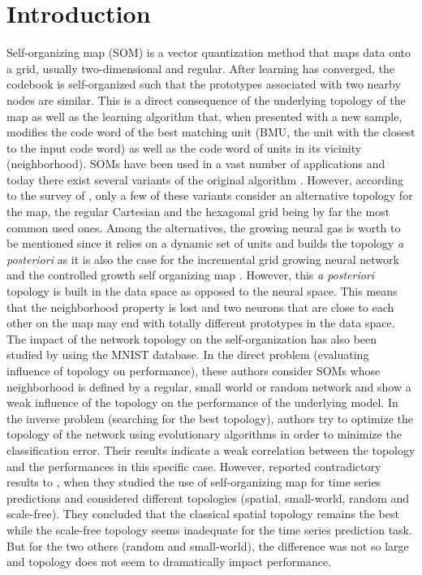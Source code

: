 \section{Introduction}

Self-organizing map \citep{Kohonen:1982} (SOM) is a vector quantization method that maps data onto a grid, usually two-dimensional and regular. After learning has converged, the codebook is self-organized such that the prototypes associated with two nearby nodes are similar. This is a direct consequence of the underlying topology of the map as well as the learning algorithm that, when presented with a new sample, modifies the code word of the best matching unit (BMU, the unit with the closest to the input code word) as well as the code word of units in its vicinity (neighborhood). SOMs have been used in a vast number of applications \citep{Kaski:1998,Oja:2003,Polla:2009} and today there exist several variants of the original algorithm \citep{Kohonen:2001}. However, according to the survey of \citet{Astudillo:2014}, only a few of these variants consider an alternative topology for the map, the regular Cartesian and the hexagonal grid being by far the most common used ones. Among the alternatives, the growing neural gas \citep{Fritzke:1994} is worth to be mentioned since it relies on a dynamic set of units and builds the topology {\em a posteriori} as it is also the case for the incremental grid growing neural network \citep{Blackmore:1995} and the controlled growth self organizing map \citep{Alahakoon:2000}. However, this {\em a posteriori} topology is built in the data space as opposed to the neural space. This means that the neighborhood property is lost and two neurons that are close to each other on the map may end with totally different prototypes in the data space. The impact of the network topology on the self-organization has also been studied by \citet{Jiang:2009} using the MNIST database. In the direct problem (evaluating influence of topology on performance), these authors consider SOMs whose neighborhood is defined by a regular, small world or random network and show a weak influence of the topology on the performance of the underlying model. In the inverse problem (searching for the best topology), authors try to optimize the topology of the network using evolutionary algorithms \citep{Eiben:2003} in order to minimize the classification error. Their results indicate a weak correlation between the topology and the performances in this specific case. However, \citet{Burguillo:2013} reported contradictory results to \citep{Eiben:2003}, when they studied the use of self-organizing map for time series predictions and considered different topologies (spatial, small-world, random and scale-free). They concluded that the classical spatial topology remains the best while the scale-free topology seems inadequate for the time series prediction task. But for the two others (random and small-world), the difference was not so large and topology does not seem to dramatically impact performance.

